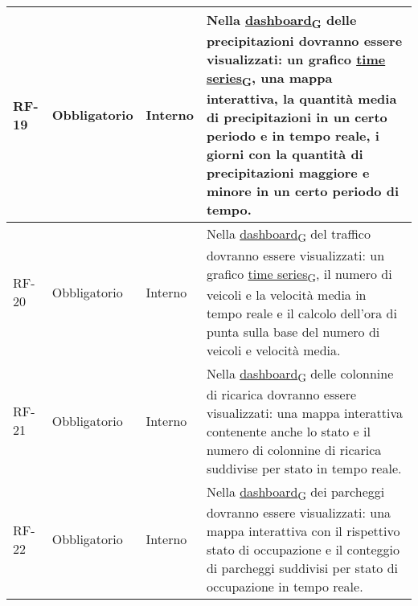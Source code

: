 \begin{longtable}{|>{\centering\arraybackslash}m{}|>{\centering\arraybackslash}m{}|>{\centering\arraybackslash}m{}|>{\centering\arraybackslash}m{}|}
	RF-19           & Obbligatorio        & Interno                                                                                                           & Nella \href{https://7last.github.io/docs/rtb/documentazione-interna/glossario\#dashboard}{dashboard\textsubscript{G}} delle precipitazioni dovranno essere visualizzati: un grafico \href{https://7last.github.io/docs/rtb/documentazione-interna/glossario\#time-series}{time series\textsubscript{G}}, una mappa interattiva, la quantità media di precipitazioni in un certo periodo e in tempo reale, i giorni con la quantità di precipitazioni maggiore e minore in un certo periodo di tempo. \\\hline
	RF-20           & Obbligatorio        & Interno                                                                                                           & Nella \href{https://7last.github.io/docs/rtb/documentazione-interna/glossario\#dashboard}{dashboard\textsubscript{G}} del traffico dovranno essere visualizzati: un grafico \href{https://7last.github.io/docs/rtb/documentazione-interna/glossario\#time-series}{time series\textsubscript{G}}, il numero di veicoli e la velocità media in tempo reale e il calcolo dell'ora di punta sulla base del numero di veicoli e velocità media.                                                           \\\hline
	RF-21           & Obbligatorio        & Interno                                                                                                           & Nella \href{https://7last.github.io/docs/rtb/documentazione-interna/glossario\#dashboard}{dashboard\textsubscript{G}} delle colonnine di ricarica dovranno essere visualizzati: una mappa interattiva contenente anche lo stato e il numero di colonnine di ricarica suddivise per stato in tempo reale.                                                                                                                                                                                             \\\hline
	RF-22           & Obbligatorio        & Interno                                                                                                           & Nella \href{https://7last.github.io/docs/rtb/documentazione-interna/glossario\#dashboard}{dashboard\textsubscript{G}} dei parcheggi dovranno essere visualizzati: una mappa interattiva con il rispettivo stato di occupazione e il conteggio di parcheggi suddivisi per stato di occupazione in tempo reale.                                                                                                                                                                                        \\\hline

\end{longtable}
